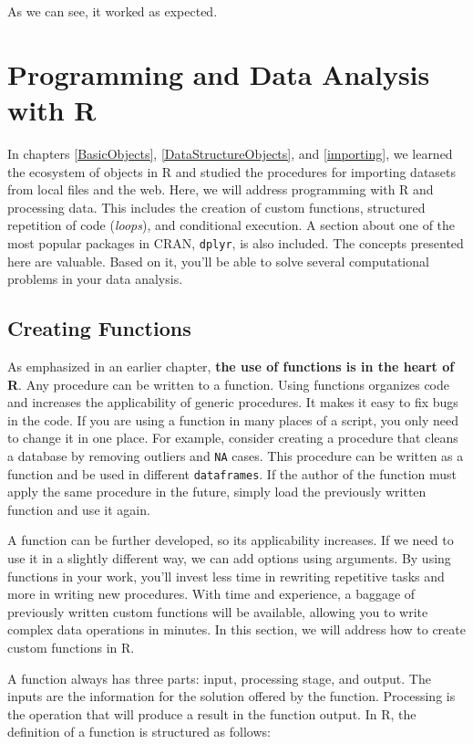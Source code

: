 \documentclass[11pt,]{book}
\begin{document}
As we can see, it worked as expected.

\chapter{Programming and Data Analysis with R}\label{programming}

In chapters \ref{BasicObjects}, \ref{DataStructureObjects}, and
\ref{importing}, we learned the ecosystem of objects in R and studied
the procedures for importing datasets from local files and the web.
Here, we will address programming with R and processing data. This
includes the creation of custom functions, structured repetition of code
(\emph{loops}), and conditional execution. A section about one of the
most popular packages in CRAN, \texttt{dplyr}, is also included. The
concepts presented here are valuable. Based on it, you'll be able to
solve several computational problems in your data analysis.

\section{Creating Functions}\label{creating-functions}

As emphasized in an earlier chapter, \textbf{the use of functions is in
the heart of R}. Any procedure can be written to a function. Using
functions organizes code and increases the applicability of generic
procedures. It makes it easy to fix bugs in the code. If you are using a
function in many places of a script, you only need to change it in one
place. For example, consider creating a procedure that cleans a database
by removing outliers and \texttt{NA} cases. This procedure can be
written as a function and be used in different \texttt{dataframes}. If
the author of the function must apply the same procedure in the future,
simply load the previously written function and use it again.

A function can be further developed, so its applicability increases. If
we need to use it in a slightly different way, we can add options using
arguments. By using functions in your work, you'll invest less time in
rewriting repetitive tasks and more in writing new procedures. With time
and experience, a baggage of previously written custom functions will be
available, allowing you to write complex data operations in minutes. In
this section, we will address how to create custom functions in R.

A function always has three parts: input, processing stage, and output.
The inputs are the information for the solution offered by the function.
Processing is the operation that will produce a result in the function
output. In R, the definition of a function is structured as follows:
\end{document}
